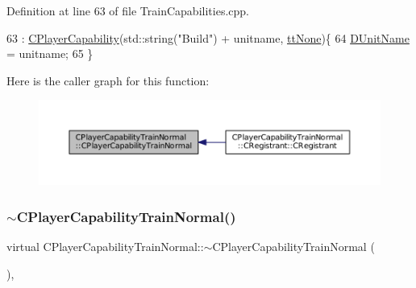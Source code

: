 Definition at line 63 of file Train\+Capabilities.\+cpp.


\begin{DoxyCode}
63                                                                                     : 
      \hyperlink{classCPlayerCapability_a303de62aba5d3f65d9a8e013c64a96c1}{CPlayerCapability}(std::string(\textcolor{stringliteral}{"Build"}) + unitname, \hyperlink{classCPlayerCapability_a9d3450ed1532fd536bd6cbb1e2eef02fac78f0e806a6b0ead030d63c27c9ce929}{ttNone})\{
64     \hyperlink{classCPlayerCapabilityTrainNormal_aed40686355e78c151910e23ea2d9d32c}{DUnitName} = unitname;
65 \}
\end{DoxyCode}
Here is the caller graph for this function\+:\nopagebreak
\begin{figure}[H]
\begin{center}
\leavevmode
\includegraphics[width=350pt]{classCPlayerCapabilityTrainNormal_a80b62a5131937c8230bf6229626dc53c_icgraph}
\end{center}
\end{figure}
\hypertarget{classCPlayerCapabilityTrainNormal_a1cc40f48e17f7e7fab3af09a85b4eb0f}{}\label{classCPlayerCapabilityTrainNormal_a1cc40f48e17f7e7fab3af09a85b4eb0f} 
\subsubsection{\texorpdfstring{$\sim$\+C\+Player\+Capability\+Train\+Normal()}{~CPlayerCapabilityTrainNormal()}}
{\footnotesize\ttfamily virtual C\+Player\+Capability\+Train\+Normal\+::$\sim$\+C\+Player\+Capability\+Train\+Normal (\begin{DoxyParamCaption}{ }\end{DoxyParamCaption})\hspace{0.3cm}{\ttfamily [inline]}, {\ttfamily [virtual]}}



